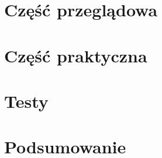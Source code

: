 \documentclass[12pt]{bsc}
\begin{document}
  
  
  \tableofcontents
  
  
  
  
  \part{Część przeglądowa}  
  
  
 
  \part{Część praktyczna}
  
  \part{Testy}
  
 
 
  \part{Podsumowanie}
  
  
  
  \pagestyle{plain}
  
  
  

  
  
  
  
\end{document}
